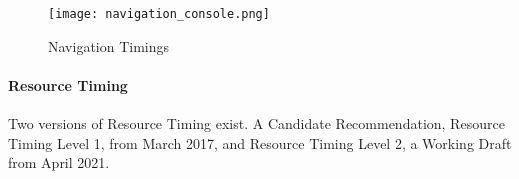 \begin{figure}[h!]
\begin{center}
\texttt{[image: navigation\_console.png]}
\caption{Navigation Timings}
\label{img:navigation_console}
\end{center}
\end{figure}










\paragraph{Resource Timing}



Two versions of Resource Timing exist.
A Candidate Recommendation, Resource Timing Level 1, from March 2017, %
and Resource Timing Level 2, a Working Draft from April 2021.  %


